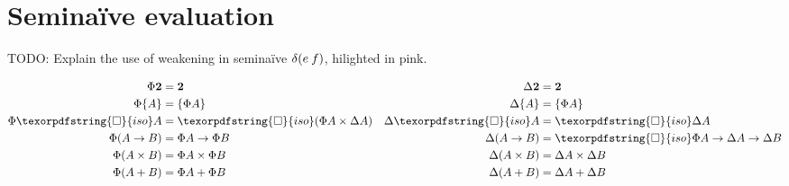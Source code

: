 \documentclass{rntz}\usepackage[a5]{rntzgeometry}\usepackage[fullwidth=13cm,width=320pt,width=115mm]{narrow}
\newcommand\todo[1]{{\color{ACMRed}#1}}
\newcommand\naive{na\"ive}
\newcommand\D\Delta
\newcommand\x\times
\newcommand\<{\mskip 4mu plus 4mu minus 1mu}
\newcommand\iso{{\texorpdfstring{\ensuremath{\square}}{iso}}}
\newcommand\isof{\iso}
\newcommand\tset[1]{\{{#1}\}}
\newcommand\tbool{{\boldsymbol 2}}
\begin{document}

\section{Semi\naive{} evaluation}

\todo{TODO: Explain the use of weakening in semi\naive{} $\delta(e\<f)$,
  hilighted in {\color{Rhodamine}pink}.}

\begin{figure*}
  \begin{align*}
    \Phi \tbool &= \tbool & \D\tbool &= \tbool\\
    \Phi \tset{A} &= \tset{\Phi A} & \D\tset{A} &= \tset{\Phi A}\\
    \Phi \isof A &= \isof{(\Phi A \x \D A)}
    & \D\isof A &= \isof \D A\\
    \Phi(A \to B) &= \Phi A \to \Phi B
    & \D(A \to B) &= \isof \Phi A \to \D A \to \D B\\
    \Phi(A \x B) &= \Phi A \x \Phi B & \D(A \x B) &= \D A \x \D B\\
    \Phi(A + B) &= \Phi A + \Phi B & \D(A + B) &= \D A + \D B
  \end{align*}
  \caption{Semi\naive{} type translation}
\end{figure*}
\end{document}

